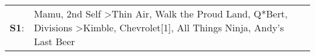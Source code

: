 \begin{supertabular}{p{0.03\textwidth}p{0.92\textwidth}}
 \textbf{S1}:  &  Mamu\textsuperscript{}, \enspace 2nd Self\textsuperscript{} \textgreater \enspace Thin Air\textsuperscript{}, \enspace Walk the Proud Land\textsuperscript{}, \enspace Q*Bert\textsuperscript{}, \enspace Divisions\textsuperscript{} \textgreater \enspace Kimble\textsuperscript{}, \enspace Chevrolet[1]\textsuperscript{}, \enspace All Things Ninja\textsuperscript{}, \enspace Andy's Last Beer\textsuperscript{}  \enspace  \\
\end{supertabular}
